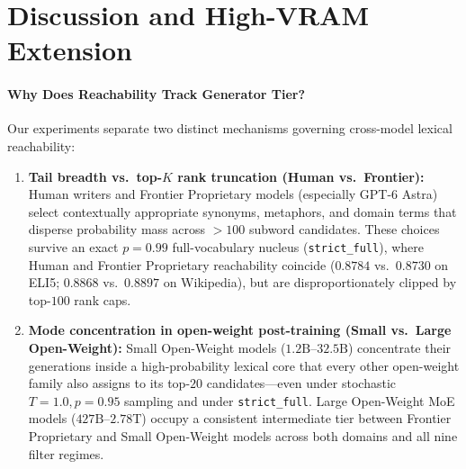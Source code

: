 \documentclass[11pt]{article}
\begin{document}
\section{Discussion and High-VRAM Extension}

\paragraph{Why Does Reachability Track Generator Tier?}
Our experiments separate two distinct mechanisms governing cross-model lexical reachability:
\begin{enumerate}
    \item \textbf{Tail breadth vs.\ top-$K$ rank truncation (Human vs.\ Frontier):} Human writers and Frontier Proprietary models (especially GPT-6 Astra) select contextually appropriate synonyms, metaphors, and domain terms that disperse probability mass across $>100$ subword candidates. These choices survive an exact $p=0.99$ full-vocabulary nucleus (\texttt{strict\_full}), where Human and Frontier Proprietary reachability coincide ($0.8784$ vs.\ $0.8730$ on ELI5; $0.8868$ vs.\ $0.8897$ on Wikipedia), but are disproportionately clipped by top-$100$ rank caps.
    \item \textbf{Mode concentration in open-weight post-training (Small vs.\ Large Open-Weight):} Small Open-Weight models ($1.2\text{B}$--$32.5\text{B}$) concentrate their generations inside a high-probability lexical core that every other open-weight family also assigns to its top-$20$ candidates—even under stochastic $T=1.0, p=0.95$ sampling and under \texttt{strict\_full}. Large Open-Weight MoE models ($427\text{B}$--$2.78\text{T}$) occupy a consistent intermediate tier between Frontier Proprietary and Small Open-Weight models across both domains and all nine filter regimes.
\end{enumerate}
\end{document}
